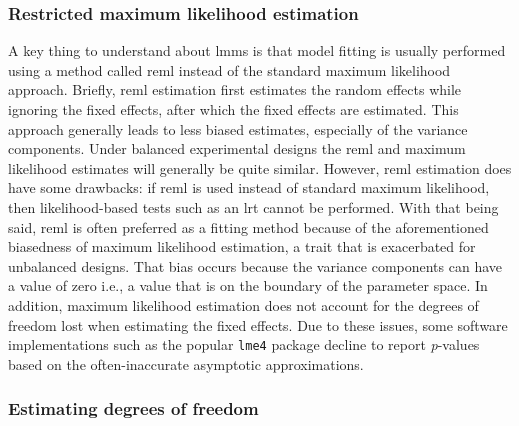 \documentclass{report}
\begin{document}
\subsubsection{Restricted maximum likelihood estimation}

A key thing to understand about \glspl{lmm} is that model fitting is usually performed using a method called \gls{reml} instead of the standard maximum likelihood approach. Briefly, \gls{reml} estimation first estimates the random effects while ignoring the fixed effects, after which the fixed effects are estimated. This approach generally leads to less biased estimates, especially of the variance components. Under balanced experimental designs the \gls{reml} and maximum likelihood estimates will generally be quite similar. However, \gls{reml} estimation does have some drawbacks: if \gls{reml} is used instead of standard maximum likelihood, then likelihood-based tests such as an \gls{lrt} cannot be performed. With that being said, \gls{reml} is often preferred as a fitting method because of the aforementioned biasedness of maximum likelihood estimation, a trait that is exacerbated for unbalanced designs. That bias occurs because the variance components can have a value of zero i.e., a value that is on the boundary of the parameter space. In addition, maximum likelihood estimation does not account for the degrees of freedom lost when estimating the fixed effects. Due to these issues, some software implementations such as the popular \texttt{lme4} package decline to report \textit{p}-values based on the often-inaccurate asymptotic approximations. 

\subsubsection{Estimating degrees of freedom}
\end{document}
